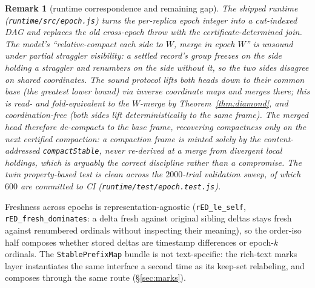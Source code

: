 \documentclass[11pt]{article}
\newtheorem{remark}[theorem]{Remark}
\newcommand{\lean}[1]{\texttt{#1}}
\newcommand{\code}[1]{\texttt{#1}}
\begin{document}
\begin{remark}[runtime correspondence and remaining gap]
\label{rem:glb}
The shipped runtime (\code{runtime/src/epoch.js}) turns the
per-replica epoch integer into a cut-indexed DAG and replaces the old
cross-epoch \emph{throw} with the certificate-determined join. The
model's ``relative-compact each side to $W$, merge
in epoch $W$'' is unsound under \emph{partial straggler visibility}: a
settled record's group freezes on the side holding a straggler and
renumbers on the side without it, so the two sides disagree on shared
coordinates. The sound protocol lifts both heads \emph{down} to their
common base (the greatest lower bound) via inverse coordinate maps and
merges there; this is read- and fold-equivalent to the $W$-merge
\emph{by} Theorem~\ref{thm:diamond}, and coordination-free (both sides
lift deterministically to the same frame). The merged head therefore
de-compacts to the base frame, recovering compactness only on the next
certified compaction: a compaction frame is minted solely by the
content-addressed \code{compactStable}, never re-derived at a merge from
divergent local holdings, which is arguably the correct discipline
rather than a compromise. The twin property-based test is clean across
the $2000$-trial validation sweep, of which $600$ are committed to CI
(\code{runtime/test/epoch.test.js}).
\end{remark}

\noindent Freshness across epochs is representation-agnostic
(\lean{rED\_le\_self}, \lean{rED\_fresh\_dominates}: a delta fresh against
original sibling deltas stays fresh against renumbered ordinals without
inspecting their meaning), so the order-iso half composes whether stored
deltas are timestamp differences or epoch-$k$ ordinals. The
\lean{StablePrefixMap} bundle is not text-specific: the rich-text marks
layer instantiates the same interface a second time as its keep-set
relabeling, and composes through the same route
(\S\ref{sec:marks}).
\end{document}

